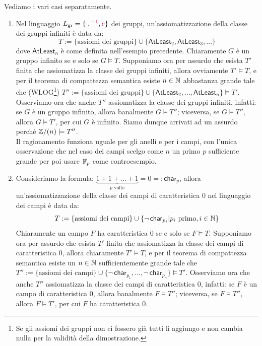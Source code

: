 \begin{soln}
    Vediamo i vari casi separatamente.
    \begin{enumerate}
        \item Nel linguaggio $L_{\text{gr}} = \{\textcolor{purple}{\cdot}, \textcolor{purple}{^{-1}}, \textcolor{purple}{e}\}$ dei gruppi, un'assiomatizzazione della classe dei gruppi infiniti è data da:
        \[ T := \{\text{assiomi dei gruppi}\} \cup \{\mathsf{AtLeast}_2, \mathsf{AtLeast}_3, \ldots\}
        \]
        dove $\mathsf{AtLeast}_n$ è come definita nell'esempio precedente. Chiaramente $G$ è un gruppo infinito se e solo se $G \models T$. Supponiamo ora per assurdo che esista $T'$ finita che assiomatizza la classe dei gruppi infiniti, allora ovviamente $T' \models T$,
        e per il teorema di compattezza semantica esiste $n \in \mathbb N$ abbastanza grande tale che (WLOG\footnote{Se gli assiomi dei gruppi non ci fossero già tutti li aggiungo e non cambia nulla per la validità della dimostrazione.}) $T'' := \{\text{assiomi dei gruppi}\} \cup \{\mathsf{AtLeast}_2, \ldots, \mathsf{AtLeast}_n\} \models T'$. Osserviamo ora che anche $T''$ assiomatizza la classe dei gruppi infiniti, infatti:
        se $G$ è un gruppo infinito, allora banalmente $G \models T''$; viceversa, se $G \models T''$, allora $G \models T'$, per cui $G$ è infinito. Siamo dunque arrivati ad un assurdo perché $\mathbb Z/(n) \models T''$.\\
        Il ragionamento funziona uguale per gli anelli e per i campi, con l'unica osservazione che nel caso dei campi scelgo come $n$ un primo $p$ sufficiente grande per poi usare $\mathbb F_p$ come controesempio. 
        \item Consideriamo la formula: $\underbrace{1 + 1 + \ldots + 1}_{p \text{ volte}} = 0 =: \mathsf{char}_p$, allora un'assiomatizzazione della classe dei campi di caratteristica 0 nel linguaggio dei campi è data da:
        \[ T := \{\text{assiomi dei campi}\} \cup \{\neg\, \mathsf{char}_{p_i} | p_i \text{ primo}, i \in \mathbb N\}
        \]
        Chiaramente un campo $F$ ha caratteristica 0 se e solo se $F \models T$. Supponiamo ora per assurdo che esista $T'$ finita che assiomatizza la classe dei campi di caratteristica 0, allora chiaramente $T' \models T$,
        e per il teorema di compattezza semantica esiste un $n \in \mathbb N$ sufficientemente grande tale che $T'' := \{\text{assiomi dei campi}\} \cup \{\neg\, \mathsf{char}_{p_1}, \ldots, \neg\, \mathsf{char}_{p_n}\} \models T'$.
        Osserviamo ora che anche $T''$ assiomatizza la classe dei campi di caratteristica 0, infatti: se $F$ è un campo di caratteristica 0, allora banalmente $F \models T''$; viceversa, se $F \models T''$, allora $F \models T'$, per cui $F$ ha caratteristica 0.

\end{enumerate}
\end{soln}
